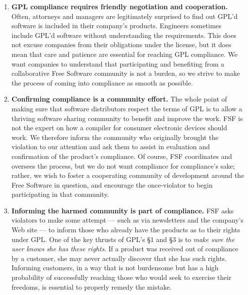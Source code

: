 {\begin{enumerate}
\item {\bf GPL compliance requires friendly negotiation and cooperation.}
  Often, attorneys and managers are legitimately surprised to find out
  GPL'd software is included in their company's products. Engineers
  sometimes include GPL'd software without understanding the requirements.
  This does not excuse companies from their obligations under the license,
  but it does mean that care and patience are essential for reaching GPL
  compliance. We want companies to understand that participating and
  benefiting from a collaborative Free Software community is not a burden,
  so we strive to make the process of coming into compliance as smooth as
  possible.

\item {\bf Confirming compliance is a community effort.}  The whole point
  of making sure that software distributors respect the terms of GPL is to
  allow a thriving software sharing community to benefit and improve the
  work. FSF is not the expert on how a compiler for consumer electronic
  devices should work. We therefore inform the community who originally
  brought the violation to our attention and ask them to assist in
  evaluation and confirmation of the product's compliance. Of course, FSF
  coordinates and oversees the process, but we do not want compliance for
  compliance's sake; rather, we wish to foster a cooperating community of
  development around the Free Software in question, and encourage the
  once-violator to begin participating in that community.

\item {\bf Informing the harmed community is part of compliance.} FSF asks
  violators to make some attempt --- such as via newsletters and the
  company's Web site --- to inform those who already have the products as
  to their rights under GPL\@. One of the key thrusts of GPL's \S 1 and
  \S 3 is to {\em make sure the user knows she has these rights\/}. If a
  product was received out of compliance by a customer, she may never
  actually discover that she has such rights. Informing customers, in a
  way that is not burdensome but has a high probability of successfully
  reaching those who would seek to exercise their freedoms, is essential
  to properly remedy the mistake.


\end{enumerate}}
